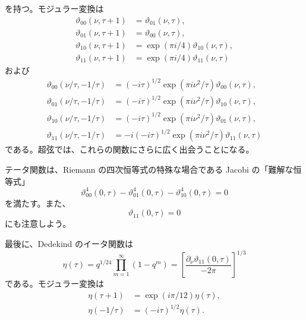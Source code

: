 を持つ。モジュラー変換は
\begin{align}
\vartheta_{00}(\nu,\tau+1)&=\vartheta_{01}(\nu,\tau),
\tag{7.2.39a}\label{eq:7.2.39a}\\
\vartheta_{01}(\nu,\tau+1)&=\vartheta_{00}(\nu,\tau),
\tag{7.2.39b}\label{eq:7.2.39b}\\
\vartheta_{10}(\nu,\tau+1)&=\exp(\pi i/4)\vartheta_{10}(\nu,\tau),
\tag{7.2.39c}\label{eq:7.2.39c}\\
\vartheta_{11}(\nu,\tau+1)&=\exp(\pi i/4)\vartheta_{11}(\nu,\tau)
\tag{7.2.39d}\label{eq:7.2.39d}
\end{align}
および
\begin{align}
\vartheta_{00}(\nu/\tau,-1/\tau)
&=(-i\tau)^{1/2}\exp(\pi i\nu^2/\tau)\vartheta_{00}(\nu,\tau),
\tag{7.2.40a}\label{eq:7.2.40a}\\
\vartheta_{01}(\nu/\tau,-1/\tau)
&=(-i\tau)^{1/2}\exp(\pi i\nu^2/\tau)\vartheta_{10}(\nu,\tau),
\tag{7.2.40b}\label{eq:7.2.40b}\\
\vartheta_{10}(\nu/\tau,-1/\tau)
&=(-i\tau)^{1/2}\exp(\pi i\nu^2/\tau)\vartheta_{01}(\nu,\tau),
\tag{7.2.40c}\label{eq:7.2.40c}\\
\vartheta_{11}(\nu/\tau,-1/\tau)
&=-i(-i\tau)^{1/2}\exp(\pi i\nu^2/\tau)\vartheta_{11}(\nu,\tau)
\tag{7.2.40d}\label{eq:7.2.40d}
\end{align}
である。超弦では、これらの関数にさらに広く出会うことになる。

テータ関数は、Riemann の四次恒等式の特殊な場合である Jacobi の「難解な恒等式」
\begin{equation}
\vartheta_{00}^4(0,\tau)-\vartheta_{01}^4(0,\tau)-\vartheta_{10}^4(0,\tau)=0
\tag{7.2.41}\label{eq:7.2.41}
\end{equation}
を満たす。また、
\begin{equation}
\vartheta_{11}(0,\tau)=0
\tag{7.2.42}\label{eq:7.2.42}
\end{equation}
にも注意しよう。

最後に、Dedekind のイータ関数は
\begin{equation}
\eta(\tau)=q^{1/24}\prod_{m=1}^{\infty}(1-q^m)
=\left[\frac{\partial_\nu\vartheta_{11}(0,\tau)}{-2\pi}\right]^{1/3}
\tag{7.2.43}\label{eq:7.2.43}
\end{equation}
である。モジュラー変換は
\begin{align}
\eta(\tau+1)&=\exp(i\pi/12)\eta(\tau),
\tag{7.2.44a}\label{eq:7.2.44a}\\
\eta(-1/\tau)&=(-i\tau)^{1/2}\eta(\tau).
\tag{7.2.44b}\label{eq:7.2.44b}
\end{align}

